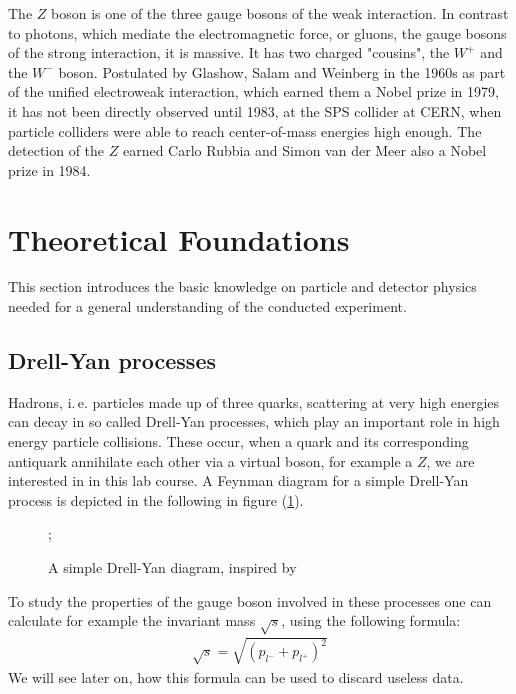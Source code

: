 \documentclass[twocolumn,
			   showpacs,%
               nofootinbib,
               aps,%
               prd,
               notitlepage,
               showkeys,
               10pt]{revtex4-1}
\begin{document}
The $Z$ boson is one of the three gauge bosons of the weak interaction. In contrast to photons, which mediate the electromagnetic force, or gluons, the gauge bosons of the strong interaction, it is massive. It has two charged "cousins", the $W^+$ and the $W^-$ boson. Postulated by Glashow, Salam and Weinberg in the 1960s as part of the unified electroweak interaction, which earned them a Nobel prize in 1979, it has not been directly observed until 1983, at the SPS collider at CERN, when particle colliders were able to reach center-of-mass energies high enough. The detection of the $Z$ earned Carlo Rubbia and Simon van der Meer also a Nobel prize in 1984.   


\section{Theoretical Foundations}
This section introduces the basic knowledge on particle and detector physics needed for a general understanding of the conducted experiment.

\subsection{Drell-Yan processes}
Hadrons, i.\,e. particles made up of three quarks, scattering at very high energies can decay in so called Drell-Yan processes, which play an important role in high energy particle collisions. These occur, when a quark and its corresponding antiquark annihilate each other via a virtual boson, for example a $Z$, we are interested in in this lab course. A Feynman diagram for a simple Drell-Yan process is depicted in the following in figure (\ref{fig:Drell-Yan}).

\begin{figure}[H]
\centering
{};
\caption{A simple Drell-Yan diagram, inspired by \cite{F91manual}}
\label{fig:Drell-Yan}
\end{figure}
	
To study the properties of the gauge boson involved in these processes one can calculate for example the invariant mass $\sqrt{s}$, using the following formula:
\begin{align}
	\sqrt{s} = \sqrt{\left(p_{l^{-}} + p_{l^{+}}\right)^2}
\end{align}
We will see later on, how this formula can be used to discard useless data.
\end{document}
